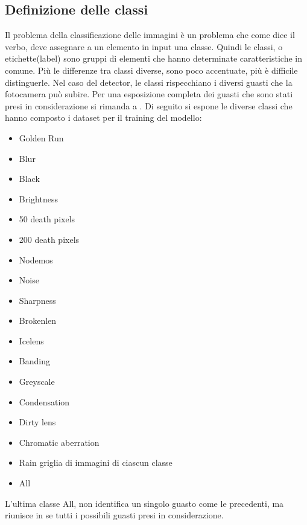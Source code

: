 \documentclass[14pt]{extarticle}
\begin{document}

\subsection{Definizione delle classi}
Il problema della classificazione delle immagini è un problema che come dice il verbo, deve assegnare a un elemento in input una classe.
Quindi le classi, o etichette(label) sono gruppi di elementi che hanno determinate caratteristiche in comune. Più le differenze tra classi diverse, sono poco accentuate, più è difficile distinguerle.
Nel caso del detector,  le classi rispecchiano i diversi guasti che la fotocamera può subire. Per una esposizione completa dei guasti che sono stati presi in considerazione si rimanda a \cite{secci2020failures}.
Di seguito si espone le diverse classi che hanno composto i dataset per il training del modello:
\begin{itemize}
\item Golden Run
\item Blur
\item Black
\item Brightness
\item 50 death pixels
\item 200 death pixels
\item Nodemos
\item Noise
\item Sharpness
\item Brokenlen
\item Icelens
\item Banding
\item Greyscale
\item Condensation
\item Dirty lens
\item Chromatic aberration
\item Rain
griglia di immagini di ciascun classe
\item All

\end{itemize}
L'ultima classe All, non identifica un singolo guasto come le precedenti, ma riunisce in se tutti i possibili guasti presi in considerazione.
\end{document}
